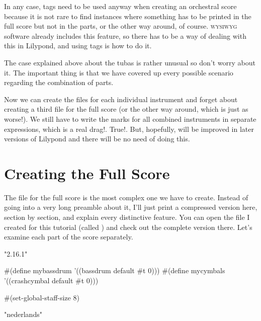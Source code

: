 \documentclass[../../LilyPond-Tutorials]{subfiles}
\begin{document}
In any case, tags need to be used anyway when creating an orchestral score because it is not rare to find instances where something has to be printed in the full score but not in the parts, or the other way around, of course.
\textsc{wysiwyg} software already includes this feature, so there has to be a way of dealing with this in Lilypond, and using tags is how to do it.

The case explained above about the tubas  is rather unusual so don't worry about it.
The important thing is that we have covered up every possible scenario regarding the combination of parts.


Now we can create the files for each individual instrument and forget about creating a third file for the full score (or the other way around, which is just as worse!).
We still have to write the marks for all combined instruments in separate expressions, which is a real drag!.
True!.
But, hopefully,  will be improved in later versions of Lilypond and there will be no need of doing this.


\section{Creating the Full Score}

The file for the full score is the most complex one we have to create.
Instead of going into a very long preamble about it, I'll just print a compressed version here, section by section, and explain every distinctive feature.
You can open the file I created for this tutorial (called ) and check out the complete version there.
Let's examine each part of the score separately.


\begin{lilypondcode}
\version "2.16.1"


#(define mybassdrum '((bassdrum default #t 0))) 
#(define mycymbals '((crashcymbal default #t 0)))

#(set-global-staff-size 8)


\language "nederlands" %
\end{lilypondcode}
\end{document}
